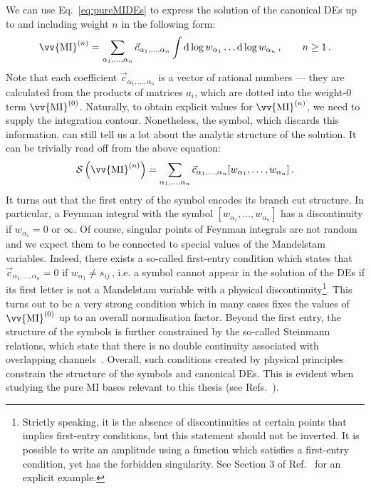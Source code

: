\documentclass[main.tex]{subfiles}
\begin{document}
We can use Eq.~\ref{eq:pureMIDEs} to express the solution of the canonical DEs up to and including weight $n$ in the following form:
\begin{equation} \label{eq:pureMIDEsupton}
    \vv{\text{MI}}^{(n)} = \sum_{\alpha_1, \ldots, \alpha_n} \vec{c}_{\alpha_1, \ldots, \alpha_n} \int \dd \log w_{\alpha_1} \ldots \dd \log w_{\alpha_n}\,, \qquad n\ge1\,.
\end{equation}
Note that each coefficient $\vec{c}_{\alpha_1, \ldots, \alpha_n}$ is a vector of rational numbers --- they are calculated from the products of matrices $a_i$, which are dotted into the weight-0 term $\vv{\text{MI}}^{(0)}$. Naturally, to obtain explicit values for $\vv{\text{MI}}^{(n)}$, we need to supply the integration contour. Nonetheless, the symbol, which discards this information, can still tell us a lot about the analytic structure of the solution. It can be trivially read off from the above equation:
\begin{equation}
    \SS\left(\vv{\text{MI}}^{(n)}\right) = \sum_{\alpha_1, \ldots, \alpha_n} \vec{c}_{\alpha_1, \ldots, \alpha_n} [w_{\alpha_1}, \ldots, w_{\alpha_n}]\,.
\end{equation}
It turns out that the first entry of the symbol encodes its branch cut structure. In particular, a Feynman integral with the symbol $[w_{\alpha_1}, \ldots, w_{\alpha_n}]$ has a discontinuity if $w_{\alpha_1}=0$ or $\infty$. Of course, singular points of Feynman integrals are not random and we expect them to be connected to special values of the Mandelstam variables. Indeed, there exists a so-called first-entry condition which states that $\vec{c}_{\alpha_1, \ldots, \alpha_n}=0$ if $w_{\alpha_1} \neq s_{ij}\,$, i.e. a symbol cannot appear in the solution of the DEs if its first letter is not a Mandelstam variable with a physical discontinuity\footnote{Strictly speaking, it is the absence of discontinuities at certain points that implies first-entry conditions, but this statement should not be inverted. It is possible to write an amplitude using a function which satisfies a first-entry condition, yet has the forbidden singularity. See Section 3 of Ref.~\cite{Zoia:2021zmb} for an explicit example.}\cite{Gaiotto:2011dt}. This turns out to be a very strong condition which in many cases fixes the values of $\vv{\text{MI}}^{(0)}$ up to an overall normalisation factor. Beyond the first entry, the structure of the symbols is further constrained by the so-called Steinmann relations, which state that there is no double continuity associated with overlapping channels~\cite{20.500.11850/135473, Steinmann:1960, Caron-Huot:2016owq, Dixon:2016nkn}. Overall, such conditions created by physical principles constrain the structure of the symbols and canonical DEs. This is evident when studying the pure MI bases relevant to this thesis (see Refs.~\cite{Abreu:2020jxa, abreu2021twoloop}).
\end{document}
